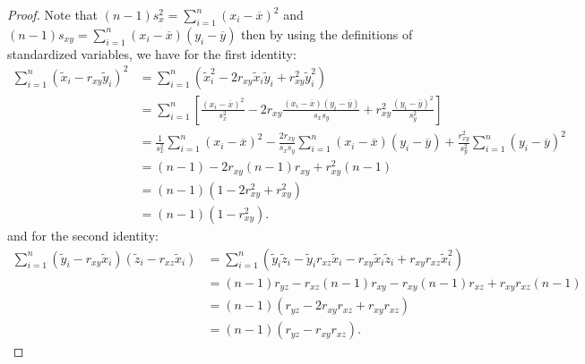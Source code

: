 \begin{proof}
    Note that \((n-1)s_x^2 = \sum_{i=1}^{n} {(x_i - \overline{x})}^2\) and \((n-1)s_{xy} = \sum_{i=1}^{n} (x_i - \overline{x})(y_i - \overline{y})\) then by using the definitions of standardized variables, we have for the first identity:
    \begin{align*}
        \sum_{i=1}^{n} {\left( \tilde{x}_i - r_{xy} \tilde{y}_i \right)}^{2} & = \sum_{i=1}^{n} \left( \tilde{x}_i^2 - 2r_{xy} \tilde{x}_i \tilde{y}_i + r_{xy}^2 \tilde{y}_i^2 \right)                                                                                                      \\
                                                                             & = \sum_{i=1}^{n} \left[ \frac{{(x_i - \overline{x})}^2}{s_x^2} - 2r_{xy} \frac{(x_i - \overline{x})(y_i - \overline{y})}{s_x s_y} + r_{xy}^2 \frac{{(y_i - \overline{y})}^2}{s_y^2} \right]                   \\
                                                                             & = \frac{1}{s_x^2} \sum_{i=1}^{n} {(x_i - \overline{x})}^2 - \frac{2r_{xy}}{s_x s_y} \sum_{i=1}^{n} (x_i - \overline{x})(y_i - \overline{y}) +  \frac{r_{xy}^2}{s_y^2} \sum_{i=1}^{n} {(y_i - \overline{y})}^2 \\
                                                                             & = (n-1) - 2r_{xy} (n-1) r_{xy} + r_{xy}^2 (n-1)                                                                                                                                                               \\
                                                                             & = (n-1)(1 - 2r_{xy}^2 + r_{xy}^2)                                                                                                                                                                             \\
                                                                             & = (n-1)(1 - r_{xy}^2).
    \end{align*}
    and for the second identity:
    \begin{align*}
        \sum_{i=1}^{n} \left( \tilde{y}_i - r_{xy} \tilde{x}_i \right)\left( \tilde{z}_i - r_{xz} \tilde{x}_i \right)
         & = \sum_{i=1}^{n} \left( \tilde{y}_i \tilde{z}_i - \tilde{y}_i r_{xz} \tilde{x}_i - r_{xy} \tilde{x}_i \tilde{z}_i + r_{xy} r_{xz} \tilde{x}_i^2 \right) \\
         & = (n-1) r_{yz} - r_{xz} (n-1) r_{xy} - r_{xy} (n-1) r_{xz} + r_{xy} r_{xz} (n-1)                                                                        \\
         & = (n-1)(r_{yz} - 2 r_{xy} r_{xz} + r_{xy} r_{xz})                                                                                                       \\
         & = (n-1)(r_{yz} - r_{xy} r_{xz}).
    \end{align*}
\end{proof}


